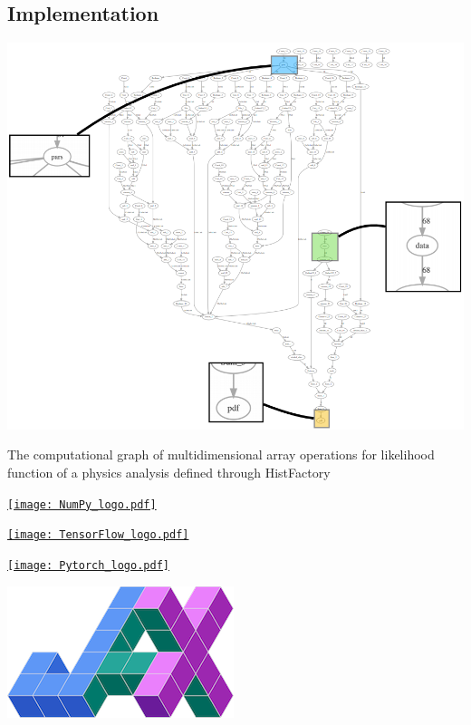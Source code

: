 \documentclass[princeton,portrait]{a0poster}
\begin{document}
\begin{multicols}{2}
 \section*{\LARGE\color{MediumBlue} Implementation}
 \begin{center}
  \includegraphics[width=0.6\linewidth]{computational_graph.png}
 \end{center}
 The computational graph of multidimensional array operations for likelihood function of a physics analysis defined through HistFactory

 \vspace{1cm}
 \begin{minipage}{0.25\linewidth}
  \begin{center}
   \href{https://github.com/numpy/numpy}{\texttt{[image: NumPy\_logo.pdf]}}
  \end{center}
 \end{minipage}%
 \quad
 \begin{minipage}{0.25\linewidth}
  \begin{center}
   \href{https://github.com/tensorflow/tensorflow}{\texttt{[image: TensorFlow\_logo.pdf]}}
  \end{center}
 \end{minipage}%
 \quad
 \begin{minipage}{0.25\linewidth}
  \begin{center}
   \href{https://github.com/pytorch/pytorch}{\texttt{[image: Pytorch\_logo.pdf]}}
  \end{center}
 \end{minipage}%
 \quad
 \begin{minipage}{0.25\linewidth}
  \begin{flushleft}
   \href{https://github.com/google/jax}{\includegraphics[width=0.5\linewidth]{JAX_logo.png}}
  \end{flushleft}
 \end{minipage}%
 \vspace{1cm}


\end{multicols}
\end{document}
